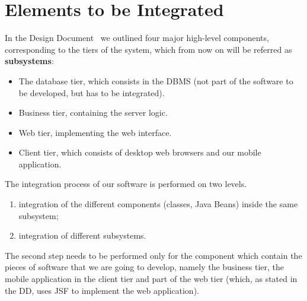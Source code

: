 \section{Elements to be Integrated}
\label{sec:elements}

In the Design Document~\cite{mytaxi-dd} we outlined four major high-level components, corresponding to the tiers of the system, which from now on will be referred as \textbf{subsystems}:
\begin{itemize}
    \item The database tier, which consists in the DBMS (not part of the software to be developed, but has to be integrated).
    \item Business tier, containing the server logic.
    \item Web tier, implementing the web interface.
    \item Client tier, which consists of desktop web browsers and our mobile application.
\end{itemize}

The integration process of our software is performed on two levels.
\begin{enumerate}
    \item integration of the different components (classes, Java Beans) inside the same subsystem;
    \item integration of different subsystems.
\end{enumerate}

The second step needs to be performed only for the component which contain the pieces of software that we are going to develop, namely the business tier, the mobile application in the client tier and part of the web tier (which, as stated in the DD, uses JSF to implement the web application).

